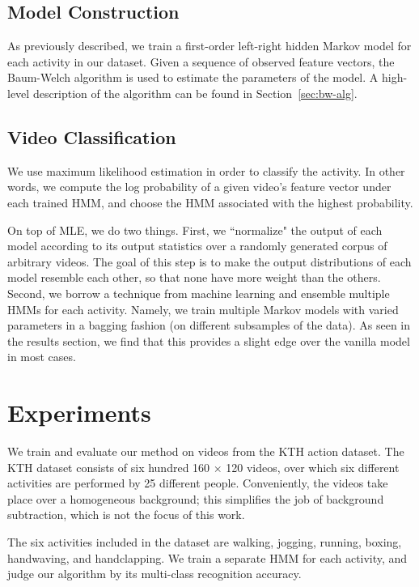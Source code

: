 \documentclass{article}
\begin{document}
\subsection{Model Construction}

As previously described, we train a first-order left-right hidden Markov model for each activity in our dataset. Given a sequence of observed feature vectors, the Baum-Welch algorithm is used to estimate the parameters of the model. A high-level description of the algorithm can be found in Section~\ref{sec:bw-alg}.

\subsection{Video Classification}

We use maximum likelihood estimation in order to classify the activity. In other words, we compute the log probability of a given video's feature vector under each trained HMM, and choose the HMM associated with the highest probability.

On top of MLE, we do two things. First, we ``normalize" the output of each model according to its output statistics over a randomly generated corpus of arbitrary videos. The goal of this step is to make the output distributions of each model resemble each other, so that none have more weight than the others. Second, we borrow a technique from machine learning and ensemble multiple HMMs for each activity. Namely, we train multiple Markov models with varied parameters in a bagging fashion (on different subsamples of the data). As seen in the results section, we find that this provides a slight edge over the vanilla model in most cases.

\section{Experiments}

We train and evaluate our method on videos from the KTH action dataset. The KTH dataset consists of six hundred 160 $\times$ 120 videos, over which six different activities are performed by 25 different people. Conveniently, the videos take place over a homogeneous background; this simplifies the job of background subtraction, which is not the focus of this work.

The six activities included in the dataset are walking, jogging, running, boxing, handwaving, and handclapping. We train a separate HMM for each activity, and judge our algorithm by its multi-class recognition accuracy.
\end{document}
